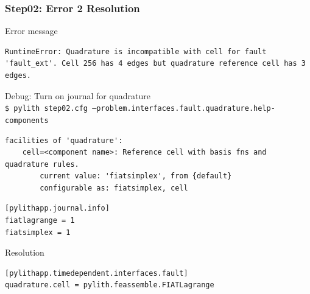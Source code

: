 \documentclass[aspectration=169]{beamer}
\newcommand{\cmd}[1]{{\footnotesize\tt \color{ltred}#1}}
\newcommand{\errlabel}[1]{{\small \color{blue}#1}}
\newcommand{\debuginfo}[1]{{\small \color{green}#1}}
\begin{document}
\begin{frame}[fragile]
  \frametitle{Step02: Error 2 Resolution}

\errlabel{Error message}
\begin{lstlisting}
RuntimeError: Quadrature is incompatible with cell for fault 'fault_ext'. Cell 256 has 4 edges but quadrature reference cell has 3 edges.
\end{lstlisting}\pause
\errlabel{Debug:} \debuginfo{Turn on journal for quadrature}\\
\cmd{\$ pylith step02.cfg --problem.interfaces.fault.quadrature.help-components}
\begin{lstlisting}
facilities of 'quadrature':
    cell=<component name>: Reference cell with basis fns and quadrature rules.
        current value: 'fiatsimplex', from {default}
        configurable as: fiatsimplex, cell
\end{lstlisting}\pause
\begin{lstlisting}
[pylithapp.journal.info]
fiatlagrange = 1
fiatsimplex = 1
\end{lstlisting}
\errlabel{Resolution}
\begin{lstlisting}
[pylithapp.timedependent.interfaces.fault]
quadrature.cell = pylith.feassemble.FIATLagrange
\end{lstlisting}

\end{frame}
\end{document}
